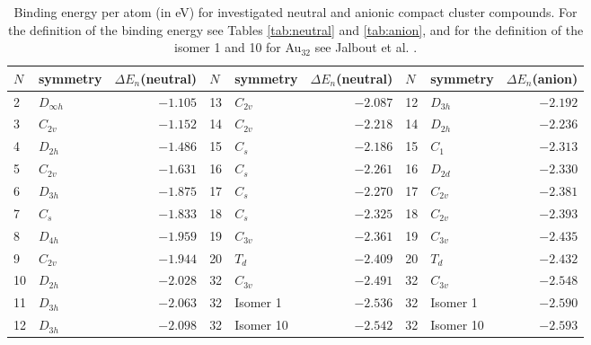 \begin{table}[ht!]
	\centering
	\caption{Binding energy per atom (in eV) for investigated neutral and anionic compact cluster compounds. For the definition of
	the binding energy see Tables \ref{tab:neutral} and \ref{tab:anion}, and for the definition of the isomer 1 and 10 for Au$_{32}$
	see Jalbout et al. \cite{Jalbout_LowSymmetryStructuresAu_2008}.}
	\begin{tabular}{llr|llr|llr}
		\toprule
		$N$  & symmetry  & $\Delta E_n$(neutral) & $N$  & symmetry  & $\Delta E_n$(neutral) & $N$  & symmetry  & $\Delta E_n$(anion) \\
		\midrule
		  2  & $D_{\infty h}$ & $-1.105$ & 13 & $C_{2v}$   & $-2.087$ & 12 & $D_{3h}$ &  $-2.192$ \\
		3  & $C_{2v}$       & $-1.152$   & 14 & $C_{2v}$ & $-2.218$ & 14 & $D_{2h}$ &  $-2.236$    \\
		  4  & $D_{2h}$       & $-1.486$ & 15 & $C_s$    & $-2.186$ & 15 & $C_1$    &  $-2.313$\\
		  5  & $C_{2v}$       & $-1.631$ & 16 & $C_s$    & $-2.261$ & 16 & $D_{2d}$ &  $-2.330$ \\
		  6  & $D_{3h}$       & $-1.875$ & 17 & $C_s$    & $-2.270$ & 17 & $C_{2v}$ &  $-2.381$ \\
		  7  & $C_s$          & $-1.833$ & 18 & $C_s$    & $-2.325$ & 18 & $C_{2v}$ &  $-2.393$ \\
		  8  & $D_{4h}$       & $-1.959$ & 19 & $C_{3v}$ & $-2.361$ & 19 & $C_{3v}$ &  $-2.435$  \\
		  9  & $C_{2v}$       & $-1.944$ & 20 & $T_d$    & $-2.409$ & 20 & $T_d$    &  $-2.432$ \\
		  10 & $D_{2h}$       & $-2.028$ & 32 & $C_{3v}$ & $-2.491$ & 32 & $C_{3v}$ &  $-2.548$\\
		  11 & $D_{3h}$       & $-2.063$ & 32 & Isomer 1 & $-2.536$ & 32 & Isomer 1 &  $-2.590$  \\
		  12 & $D_{3h}$ 	  & $-2.098$ & 32 & Isomer 10& $-2.542$ & 32 & Isomer 10&  $-2.593$\\
		\bottomrule
	\end{tabular}
	\label{tab:Aun}
\end{table}


